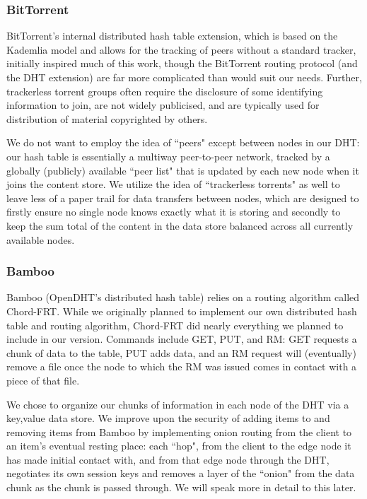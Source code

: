 \subsubsection*{BitTorrent} %

BitTorrent's internal distributed hash table extension, which is based on the Kademlia model and allows for the tracking of peers without
a standard tracker, initially inspired much of this work, though the BitTorrent routing protocol (and the DHT extension) are far more
complicated than would suit our needs. Further, trackerless torrent groups often require the disclosure of some identifying
information to join, are not widely publicised, and are typically used for distribution of material copyrighted by others.

We do not want to employ the idea of ``peers" except between nodes in our DHT: our hash table
is essentially a multiway peer-to-peer network, tracked by a globally (publicly) available ``peer list" that is updated by each new
node when it joins the content store. We utilize the idea of ``trackerless torrents" as well to leave less of a paper trail for data
transfers between nodes, which are designed to firstly ensure no single node knows exactly what it is storing and secondly to keep
the sum total of the content in the data store balanced across all currently available nodes.



\subsubsection*{Bamboo} %

Bamboo (OpenDHT's distributed hash table) relies on a routing algorithm called Chord-FRT. While we originally planned to implement our
own distributed hash table and routing algorithm, Chord-FRT did nearly everything we planned to include in our version. Commands include
GET, PUT, and RM: GET requests a chunk of data to the table, PUT adds data, and an RM request will (eventually) remove a file once the
node to which the RM was issued comes in contact with a piece of that file.

We chose to organize our chunks of information in each node of the DHT via a key,value data store. We improve upon the security of adding
items to and removing items from Bamboo by implementing onion routing from the client to an item's eventual resting place: each ``hop",
from the client to the edge node it has made initial contact with, and from that edge node through the DHT, negotiates its own session keys
and removes a layer of the ``onion" from the data chunk as the chunk is passed through. We will speak more in detail to this later.

